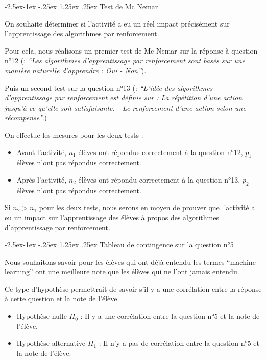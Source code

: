 \documentclass[
12pt,
french,
]{article}
\makeatletter
\renewcommand\paragraph{\@startsection{paragraph}{4}{\z@}%
        {-2.5ex\@plus -1ex \@minus -.25ex}%
        {1.25ex \@plus .25ex}%
        {\normalfont\normalsize\bfseries}}
\makeatother
\begin{document}
\hypertarget{test-de-mc-nemar}{%
\paragraph{Test de Mc Nemar}\label{test-de-mc-nemar}}

On souhaite déterminer si l'activité a eu un réel impact précisément sur
l'apprentissage des algorithmes par renforcement.

Pour cela, nous réalisons un premier test de Mc Nemar sur la réponse à
question n°12 (: \emph{``Les algorithmes d'apprentissage par
renforcement sont basés sur une manière naturelle d'apprendre : Oui -
Non''}).

Puis un second test sur la question n°13 (: \emph{``L'idée des
algorithmes d'apprentissage par renforcement est définie sur : La
répétition d'une action jusqu'à ce qu'elle soit satisfaisante. - Le
renforcement d'une action selon une récompense''.})

On effectue les mesures pour les deux tests :

\begin{itemize}
\item
  Avant l'activité, \(n_1\) élèves ont répondus correctement à la
  question n°12, \(p_1\) élèves n'ont pas répondus correctement.
\item
  Après l'activité, \(n_2\) élèves ont répondu correctement à la
  question n°13, \(p_2\) élèves n'ont pas répondus correctement.
\end{itemize}

Si \(n_2 > n_1\) pour les deux tests, nous serons en moyen de prouver
que l'activité a eu un impact sur l'apprentissage des élèves à propos
des algorithmes d'apprentissage par renforcement.

\hypertarget{tableau-de-contingence-sur-la-question-n5}{%
\paragraph{Tableau de contingence sur la question
n°5}\label{tableau-de-contingence-sur-la-question-n5}}

Nous souhaitons savoir pour les élèves qui ont déjà entendu les termes
``machine learning'' ont une meilleure note que les élèves qui ne l'ont
jamais entendu.

Ce type d'hypothèse permettrait de savoir s'il y a une corrélation entre
la réponse à cette question et la note de l'élève.

\begin{itemize}
\item
  Hypothèse nulle \(H_0\) : Il y a une corrélation entre la question n°5
  et la note de l'élève.
\item
  Hypothèse alternative \(H_1\) : Il n'y a pas de corrélation entre la
  question n°5 et la note de l'élève.
\end{itemize}
\end{document}
